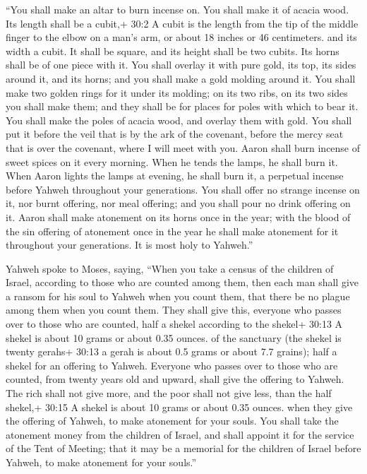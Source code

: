  ``You shall make an altar to burn incense on. You shall
make it of acacia wood.  Its length shall be a cubit,+ 30:2
A cubit is the length from the tip of the middle finger to the elbow on
a man's arm, or about 18 inches or 46 centimeters. and its width a
cubit. It shall be square, and its height shall be two cubits. Its horns
shall be of one piece with it.  You shall overlay it with
pure gold, its top, its sides around it, and its horns; and you shall
make a gold molding around it.  You shall make two golden
rings for it under its molding; on its two ribs, on its two sides you
shall make them; and they shall be for places for poles with which to
bear it.  You shall make the poles of acacia wood, and
overlay them with gold.  You shall put it before the veil
that is by the ark of the covenant, before the mercy seat that is over
the covenant, where I will meet with you.  Aaron shall burn
incense of sweet spices on it every morning. When he tends the lamps, he
shall burn it.  When Aaron lights the lamps at evening, he
shall burn it, a perpetual incense before Yahweh throughout your
generations.  You shall offer no strange incense on it, nor
burnt offering, nor meal offering; and you shall pour no drink offering
on it.  Aaron shall make atonement on its horns once in the
year; with the blood of the sin offering of atonement once in the year
he shall make atonement for it throughout your generations. It is most
holy to Yahweh.''

 Yahweh spoke to Moses, saying,  ``When you
take a census of the children of Israel, according to those who are
counted among them, then each man shall give a ransom for his soul to
Yahweh when you count them, that there be no plague among them when you
count them.  They shall give this, everyone who passes over
to those who are counted, half a shekel according to the shekel+ 30:13 A
shekel is about 10 grams or about 0.35 ounces. of the sanctuary (the
shekel is twenty gerahs+ 30:13 a gerah is about 0.5 grams or about 7.7
grains); half a shekel for an offering to Yahweh.  Everyone
who passes over to those who are counted, from twenty years old and
upward, shall give the offering to Yahweh.  The rich shall
not give more, and the poor shall not give less, than the half shekel,+
30:15 A shekel is about 10 grams or about 0.35 ounces. when they give
the offering of Yahweh, to make atonement for your souls. 
You shall take the atonement money from the children of Israel, and
shall appoint it for the service of the Tent of Meeting; that it may be
a memorial for the children of Israel before Yahweh, to make atonement
for your souls.''

